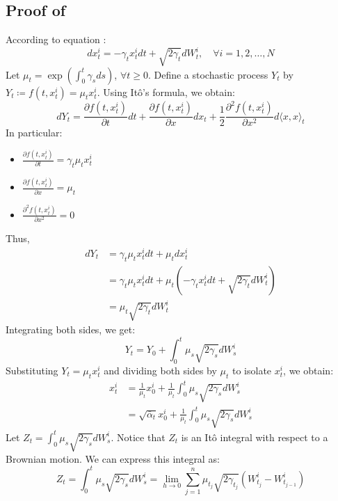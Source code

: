 \documentclass[a4paper,10pt]{article}
\begin{document}
\subsection{Proof of } \label{sec:proof_solution_processus_direct}
According to equation :
\begin{equation*}
dx_t^i = -\gamma_t x_t^i dt + \sqrt{2\gamma_t} dW_t^i, \quad \forall i=1,2,\dots,N
\end{equation*}
Let $\mu_t = \exp\left(\int_0^t \gamma_s ds\right)$, $\forall t \geq 0$.
Define a stochastic process $Y_t$ by $Y_t \coloneqq f(t, x_t^i) = \mu_t x_t^i$.
Using Itô's formula, we obtain:
\begin{equation*}
dY_t = \frac{\partial f(t, x_t^i)}{\partial t} dt + \frac{\partial f(t, x_t^i)}{\partial x} dx_t + \frac{1}{2} \frac{\partial^2 f(t, x_t^i)}{\partial x^2} d\langle x, x \rangle_t
\end{equation*}
In particular:
\begin{itemize}
    \item[] $\frac{\partial f(t, x_t^i)}{\partial t} = \gamma_t \mu_t x_t^i$
    \item[] $\frac{\partial f(t, x_t^i)}{\partial x} = \mu_t$
    \item[] $\frac{\partial^2 f(t, x_t^i)}{\partial x^2} = 0$
\end{itemize}
Thus,
\begin{align*}
dY_t &= \gamma_t \mu_t x_t^i dt + \mu_t dx_t^i \\
&= \gamma_t \mu_t x_t^i dt + \mu_t \left(-\gamma_t x_t^i dt + \sqrt{2\gamma_t} dW_t^i\right) \\
&= \mu_t \sqrt{2\gamma_t} dW_t^i
\end{align*}
Integrating both sides, we get:
\begin{equation*}
Y_t = Y_0 + \int_0^t \mu_s \sqrt{2\gamma_s} dW_s^i
\end{equation*}
Substituting $Y_t = \mu_t x_t^i$ and dividing both sides by $\mu_t$ to isolate $x_t^i$, we obtain:
\begin{align*}
x_t^i &= \frac{1}{\mu_t} x_0^i + \frac{1}{\mu_t} \int_0^t \mu_s \sqrt{2\gamma_s} dW_s^i \\
&= \sqrt{\bar{\alpha}_t} x_0^i + \frac{1}{\mu_t} \int_0^t \mu_s \sqrt{2\gamma_s} dW_s^i
\end{align*}
Let $Z_t = \int_0^t \mu_s \sqrt{2\gamma_s} dW_s^i$. Notice that $Z_t$ is an Itô integral with respect to a Brownian motion. We can express this integral as:
\begin{equation*}
Z_t = \int_0^t \mu_s \sqrt{2\gamma_s} dW_s^i = \lim_{h \to 0} \sum_{j=1}^n \mu_{t_j} \sqrt{2\gamma_{t_j}} (W_{t_j}^i - W_{t_{j-1}}^i)
\end{equation*}
\end{document}
